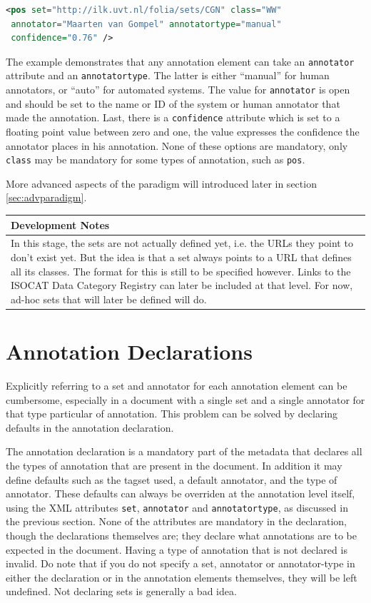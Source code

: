 \documentclass[a4paper,12pt]{report}
\newenvironment{devnotes}
{
\begin{center}
    \begin{tabular}[h!]{|p{0.8\textwidth}|}
    \hline
    {\bf Development Notes}\\\hline}
{   \\\hline
    \end{tabular}
\end{center}}
\begin{document}
\begin{lstlisting}[language=xml]
<pos set="http://ilk.uvt.nl/folia/sets/CGN" class="WW" 
 annotator="Maarten van Gompel" annotatortype="manual"
 confidence="0.76" />
\end{lstlisting}

The example demonstrates that any annotation element can take an \texttt{annotator} attribute and an \texttt{annotatortype}. The latter is either ``manual'' for human annotators, or ``auto'' for automated systems.  The value for \texttt{annotator} is open and should be set to the name or ID of the system or human annotator that made the annotation. Last, there is a \texttt{confidence} attribute which is set to a floating point value between zero and one, the value expresses the confidence the annotator places in his annotation. None of these options are mandatory, only \texttt{class} may be mandatory for some types of annotation, such as \texttt{pos}.

More advanced aspects of the paradigm will introduced later in section \ref{sec:advparadigm}.

\begin{devnotes}
In this stage, the sets are not actually defined yet, i.e. the URLs they point to don't exist yet. But the idea is that a set always points to a URL that defines all its classes. The format for this is still to be specified however. Links to the ISOCAT Data Category Registry can later be included at that level. For now, ad-hoc sets that will later be defined will do.
\end{devnotes}


\section{Annotation Declarations}

Explicitly referring to a set and annotator for each annotation element can be cumbersome, especially in a document with a single set and a single annotator for that type particular of annotation. This problem can be solved by declaring defaults in the annotation declaration.

The annotation declaration is a mandatory part of the metadata that declares all the types of annotation that are present in the document. In addition it may define defaults such as the tagset used, a default annotator, and the type of annotator. These defaults can always be overriden at the annotation level itself, using the XML attributes \texttt{set}, \texttt{annotator} and \texttt{annotatortype}, as discussed in the previous section. None of the attributes are mandatory in the declaration, though the declarations themselves are; they declare what annotations are to be expected in the document. Having a type of annotation that is not declared is invalid. Do note that if you do not specify a set, annotator or annotator-type in either the declaration or in the annotation elements themselves, they will be left undefined. Not declaring sets is generally a bad idea.  
\end{document}
